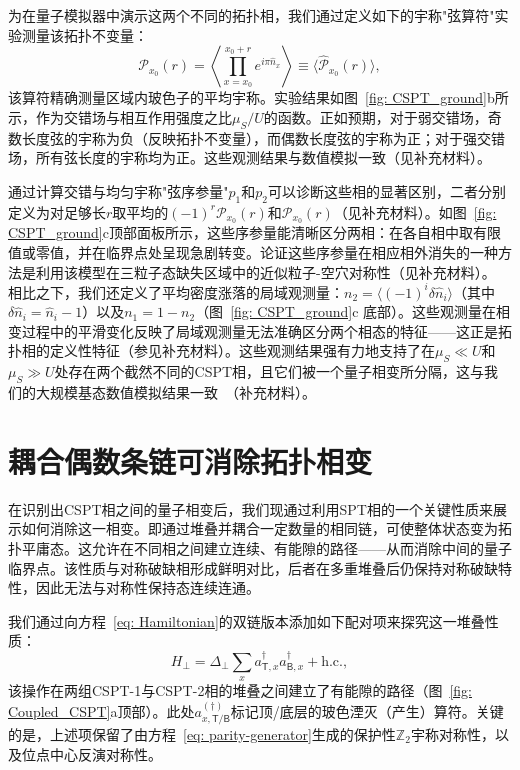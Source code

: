 \documentclass[preprint,superscriptaddress,floatfix, nofootinbib]{revtex4-2}
\begin{document}
为在量子模拟器中演示这两个不同的拓扑相，我们通过定义如下的宇称"弦算符"实验测量\cite{Hilker17, Wei23}该拓扑不变量：
\begin{equation}
\label{eq: POP}
\mathcal{P}_{x_0}(r) =  \left\langle \prod_{x=x_0}^{x_0+r} e^{i\pi \hat n_x}\right\rangle \equiv \langle \hat{\mathcal{P}}_{x_0}(r) \rangle,
\end{equation}
该算符精确测量区域内玻色子的平均宇称。实验结果如图~\ref{fig: CSPT_ground}b所示，作为交错场与相互作用强度之比$\mu_S/U$的函数。正如预期，对于弱交错场，奇数长度弦的宇称为负（反映拓扑不变量），而偶数长度弦的宇称为正；对于强交错场，所有弦长度的宇称均为正。这些观测结果与数值模拟一致（见补充材料）。

通过计算交错与均匀宇称"弦序参量"$p_1$和$p_2$可以诊断这些相的显著区别，二者分别定义为对足够长$r$取平均的$(-1)^{r} \mathcal{P}_{x_0}(r)$和$\mathcal{P}_{x_0}(r)$（见补充材料）。如图~\ref{fig: CSPT_ground}c顶部面板所示，这些序参量能清晰区分两相：在各自相中取有限值或零值，并在临界点处呈现急剧转变。论证这些序参量在相应相外消失的一种方法是利用该模型在三粒子态缺失区域中的近似粒子-空穴对称性（见补充材料）。
相比之下，我们还定义了平均密度涨落的局域观测量：$n_2= \langle (-1)^i\delta\hat{n}_i\rangle $（其中$\delta \hat{n}_i=\hat{n}_i-1$）以及$n_1= 1 - n_2$（图~\ref{fig: CSPT_ground}c 底部）。这些观测量在相变过程中的平滑变化反映了局域观测量无法准确区分两个相态的特征——这正是拓扑相的定义性特征（参见补充材料）。这些观测结果强有力地支持了在$\mu_S \ll U$和$\mu_S \gg U$处存在两个截然不同的CSPT相，且它们被一个量子相变所分隔，这与我们的大规模基态数值模拟结果一致~\cite{Sahay2025}（补充材料）。
\section{耦合偶数条链可消除拓扑相变}

在识别出CSPT相之间的量子相变后，我们现通过利用SPT相的一个关键性质来展示如何消除这一相变。即通过堆叠并耦合一定数量的相同链，可使整体状态变为拓扑平庸态\cite{Turner11, Fidkowski11, Pollmann2012, Schuch2011, Chen2011, Chen2012}。这允许在不同相之间建立连续、有能隙的路径——从而消除中间的量子临界点。该性质与对称破缺相形成鲜明对比，后者在多重堆叠后仍保持对称破缺特性，因此无法与对称性保持态连续连通。

我们通过向方程~\eqref{eq: Hamiltonian}的双链版本添加如下配对项来探究这一堆叠性质：
\begin{equation}
    H_{\perp} = \Delta_{\perp} \sum_{x} a^{\dagger}_{\mathsf{T}, x} a^{\dagger}_{\mathsf{B}, x}   + \text{h.c.},
\label{eq: coupling}
\end{equation}
该操作在两组CSPT-1与CSPT-2相的堆叠之间建立了有能隙的路径（图~\ref{fig: Coupled_CSPT}a顶部）。此处$a_{x, \mathsf{T}/\mathsf{B}}^{(\dagger)}$标记顶/底层的玻色湮灭（产生）算符。关键的是，上述项保留了由方程~\eqref{eq: parity-generator}生成的保护性$\mathbb{Z}_2$宇称对称性，以及位点中心反演对称性。
\end{document}
